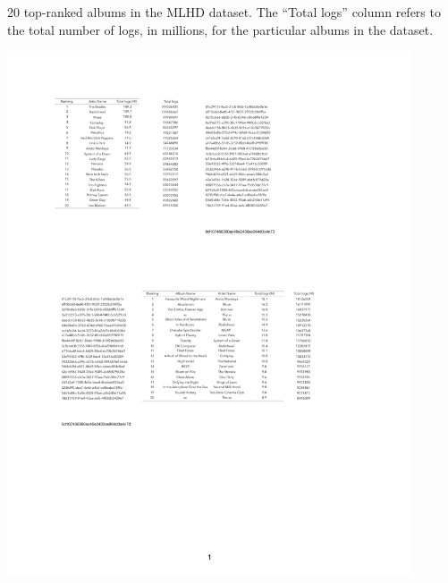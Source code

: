 \graphicspath{{./figs/ch6/}}
\begin{table}[!h]
\centering
\caption[20 top-ranked albums in the MLHD dataset]{20 top-ranked albums in the MLHD dataset. The ``Total logs'' column refers to the total number of logs, in millions, for the particular albums in the dataset.}\label{table:album_ranking}
\includegraphics[width = 0.9\textwidth]{ranking_album_cropped.pdf}
\end{table}



